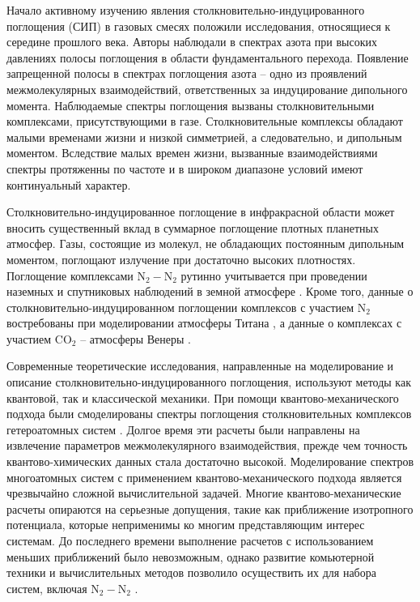 Начало активному изучению явления столкновительно-индуцированного поглощения (СИП) в газовых смесях положили исследования, относящиеся к середине прошлого века. Авторы \cite{crawford1949} наблюдали в спектрах азота при высоких давлениях полосы поглощения в области фундаментального перехода. Появление запрещенной полосы в спектрах поглощения азота -- одно из проявлений межмолекулярных взаимодействий, ответственных за индуцирование дипольного момента. Наблюдаемые спектры поглощения вызваны столкновительными комплексами, присутствующими в газе. Столкновительные комплексы обладают малыми временами жизни и низкой симметрией, а следовательно, и дипольным моментом. Вследствие малых времен жизни, вызванные взаимодействиями спектры протяженны по частоте и в широком диапазоне условий имеют континуальный характер. \par 
Столкновительно-индуцированное поглощение в инфракрасной области может вносить существенный вклад в суммарное поглощение плотных планетных атмосфер. Газы, состоящие из молекул, не обладающих постоянным дипольным моментом, поглощают излучение при достаточно высоких плотностях. Поглощение комплексами N$_2-$N$_2$ рутинно учитывается при проведении наземных и спутниковых наблюдений в земной атмосфере \cite{sioris2014}. Кроме того, данные о столкновительно-индуцированном поглощении комплексов с участием N$_2$ востребованы при моделировании атмосферы Титана \cite{borysow1986}, а данные о комплексах с участием CO$_2$ -- атмосферы Венеры \cite{gruszka1997}. \par
Современные теоретические исследования, направленные на моделирование и описание столкновительно-индуцированного поглощения, используют методы как квантовой, так и классической механики. При помощи квантово-механического подхода были смоделированы спектры поглощения столкновительных комплексов гетероатомных систем \cite{sharma1975, meyer1986}. Долгое время эти расчеты были направлены на извлечение параметров межмолекулярного взаимодействия, прежде чем точность квантово-химических данных стала достаточно высокой. Моделирование спектров многоатомных систем с применением квантово-механического подхода является чрезвычайно сложной вычислительной задачей. Многие квантово-механические расчеты опираются на серьезные допущения, такие как приближение изотропного потенциала, которые неприменимы ко многим представляющим интерес системам. До последнего времени выполнение расчетов с использованием меньших приближений было невозможным, однако развитие комьютерной техники и вычислительных методов позволило осуществить их для набора систем, включая N$_2-$N$_2$ \cite{karman2015}. \par
